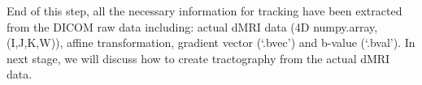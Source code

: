 End of this step, all the necessary information for tracking have been extracted from the DICOM raw data including: actual dMRI data (4D numpy.array, (I,J,K,W)), affine transformation, gradient vector (‘.bvec’) and b-value (‘.bval’). In next stage, we will discuss how to create tractography from the actual dMRI data.
